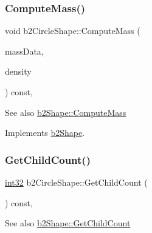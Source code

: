 \mbox{\label{classb2_circle_shape_a7dc07891abd015863fbf03076e47eec5}} 
\subsubsection{\texorpdfstring{ComputeMass()}{ComputeMass()}}
{\footnotesize\ttfamily void b2\+Circle\+Shape\+::\+Compute\+Mass (\begin{DoxyParamCaption}\item[{\mbox{\hyperlink{structb2_mass_data}{b2\+Mass\+Data}} $\ast$}]{mass\+Data,  }\item[{\mbox{\hyperlink{b2_settings_8h_aacdc525d6f7bddb3ae95d5c311bd06a1}{float32}}}]{density }\end{DoxyParamCaption}) const\hspace{0.3cm}{\ttfamily [override]}, {\ttfamily [virtual]}}

\begin{DoxySeeAlso}{See also}
\mbox{\hyperlink{classb2_shape_a61b365526241b47f124789b0309cac69}{b2\+Shape\+::\+Compute\+Mass}} 
\end{DoxySeeAlso}


Implements \mbox{\hyperlink{classb2_shape_a61b365526241b47f124789b0309cac69}{b2\+Shape}}.

\mbox{\label{classb2_circle_shape_a552db3402aed5d12c3177981e5208065}} 
\subsubsection{\texorpdfstring{GetChildCount()}{GetChildCount()}}
{\footnotesize\ttfamily \mbox{\hyperlink{b2_settings_8h_a43d43196463bde49cb067f5c20ab8481}{int32}} b2\+Circle\+Shape\+::\+Get\+Child\+Count (\begin{DoxyParamCaption}{ }\end{DoxyParamCaption}) const\hspace{0.3cm}{\ttfamily [override]}, {\ttfamily [virtual]}}

\begin{DoxySeeAlso}{See also}
\mbox{\hyperlink{classb2_shape_a05a3c445017d96df9238ceefe6ce37ab}{b2\+Shape\+::\+Get\+Child\+Count}} 
\end{DoxySeeAlso}



